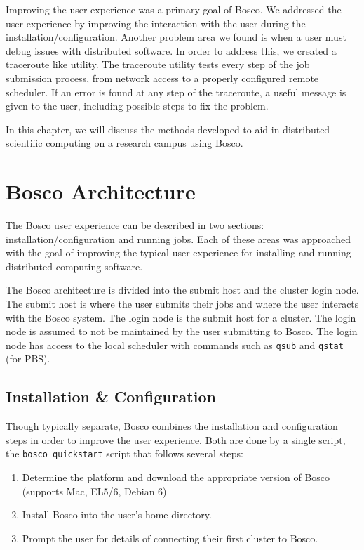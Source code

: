 Improving the user experience was a primary goal of Bosco.  We addressed the user experience by improving the interaction with the user during the installation/configuration.  Another problem area we found is when a user must debug issues with distributed software.  In order to address this, we created a traceroute \cite{mao2003towards} like utility.  The traceroute utility tests every step of the job submission process, from network access to a properly configured remote scheduler.  If an error is found at any step of the traceroute, a useful message is given to the user, including possible steps to fix the problem.




In this chapter, we will discuss the methods developed to aid in distributed scientific computing on a research campus using Bosco.  

\section{Bosco Architecture}
\label{sec:boscoarch}

% 

The Bosco user experience can be described in two sections: installation/configuration and running jobs.  Each of these areas was approached with the goal of improving the typical user experience for installing and running distributed computing software.

The Bosco architecture is divided into the submit host and the cluster login node.  The submit host is where the user submits their jobs and where the user interacts with the Bosco system.  The login node is the submit host for a cluster.  The login node is assumed to not be maintained by the user submitting to Bosco.  The login node has access to the local scheduler with commands such as \texttt{qsub} and \texttt{qstat} (for PBS). 

\subsection{Installation \& Configuration}
Though typically separate, Bosco combines the installation and configuration steps in order to improve the user experience.  Both are done by a single script, the \texttt{bosco\_quickstart} script that follows several steps:

\begin{enumerate}
\item Determine the platform and download the appropriate version of Bosco (supports Mac, EL5/6, Debian 6)
\item Install Bosco into the user's home directory.
\item Prompt the user for details of connecting their first cluster to Bosco.
\end{enumerate}

